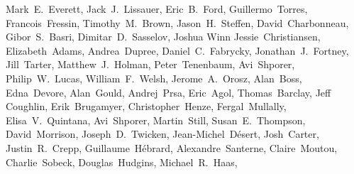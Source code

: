 \documentclass{emulateapj}
\begin{document}
{Mark~E.~Everett, %
Jack~J.~Lissauer, %
Eric~B.~Ford, %
Guillermo~Torres, %
Francois~Fressin, %
Timothy~M.~Brown, %
Jason~H.~Steffen, %
David~Charbonneau, %
Gibor~S.~Basri, %
Dimitar~D.~Sasselov, %
Joshua Winn %
Jessie~Christiansen, %
Elizabeth~Adams, %
Andrea~Dupree, %
Daniel~C.~Fabrycky, %
Jonathan~J.~Fortney, %
Jill~Tarter, %
Matthew~J.~Holman, %
Peter~Tenenbaum, %
Avi~Shporer, %
Philip~W.~Lucas, %
William~F.~Welsh, %
Jerome~A.~Orosz, %
Alan~Boss, %
Edna~Devore, %
Alan~Gould, %
Andrej~Prsa, %
Eric~Agol,  %
Thomas~Barclay,  %
Jeff Coughlin,   %
Erik~Brugamyer, %
Christopher~Henze,  %
Fergal~Mullally, %
Elisa~V.~Quintana,   %
Avi~Shporer,   %
Martin~Still,      %
Susan~E.~Thompson,   %
David~Morrison, %
Joseph~D.~Twicken, %
Jean-Michel~D\'esert, %
Josh~Carter, %
Justin~R.~Crepp, %
Guillaume~H\'{e}brard, %
Alexandre~Santerne, %
Claire~Moutou,  %
Charlie~Sobeck, %
Douglas~Hudgins, %
Michael~R.~Haas, %
}   %
\end{document}
